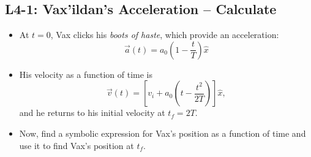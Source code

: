 \documentclass[]{article}
\begin{document}
\begin{PresentSpace}
\vspace{-10pt}
\section*{L4-1: Vax'ildan's Acceleration -- Calculate}
\vspace{-10pt}
\begin{itemize}
	\item At $t=0$, Vax clicks his \textit{boots of haste}, which provide an acceleration:
	\[
	\vec{a}(t) = a_{0}\left(1-\frac{t}{T}\right)\hat{x}
	\]
	\item His velocity as a function of time is
	\[
	\vec{v}(t) = \left[v_{i}+a_{0}\left(t-\frac{t^{2}}{2T}\right)\right]\hat{x},
	\]
	and he returns to his initial velocity at $t_{f}=2T$.
	\item Now, find a symbolic expression for Vax's position as a function of time and use it to find Vax's position at $t_{f}$.
\end{itemize}
\end{PresentSpace}
\newpage
\end{document}
